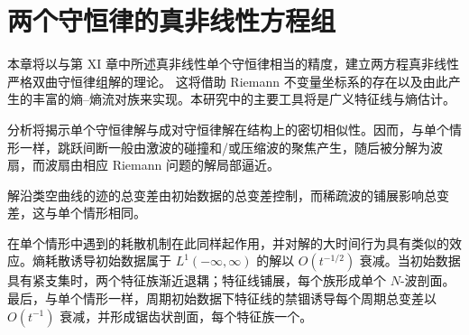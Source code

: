 \documentclass[../main.tex]{subfiles}
\begin{document}
\chapter{两个守恒律的真非线性方程组}\label{chapter:ch12-两方程真非线性组}

本章将以与第 XI 章中所述真非线性单个守恒律相当的精度，建立两方程真非线性严格双曲守恒律组解的理论。
这将借助 Riemann 不变量坐标系的存在以及由此产生的丰富的熵--熵流对族来实现。本研究中的主要工具将是广义特征线与熵估计。

分析将揭示单个守恒律解与成对守恒律解在结构上的密切相似性。因而，与单个情形一样，跳跃间断一般由激波的碰撞和/或压缩波的聚焦产生，随后被分解为波扇，而波扇由相应 Riemann 问题的解局部逼近。

解沿类空曲线的迹的总变差由初始数据的总变差控制，而稀疏波的铺展影响总变差，这与单个情形相同。

在单个情形中遇到的耗散机制在此同样起作用，并对解的大时间行为具有类似的效应。熵耗散诱导初始数据属于 $L^1(-\infty,\infty)$ 的解以 $O(t^{-1/2})$ 衰减。当初始数据具有紧支集时，两个特征族渐近退耦；特征线铺展，每个族形成单个 $N$-波剖面。最后，与单个情形一样，周期初始数据下特征线的禁锢诱导每个周期总变差以 $O(t^{-1})$ 衰减，并形成锯齿状剖面，每个特征族一个。












\end{document}
